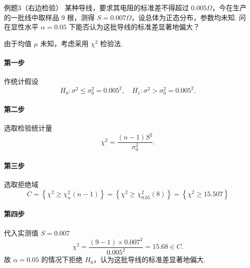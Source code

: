 \begin{question}{例题3（右边检验）}
    某种导线，要求其电阻的标准差不得超过 $0.005\Omega$，今在生产的一批线中取样品 9 根，测得 $S=0.007\Omega$，设总体为正态分布，参数均未知. 问在显性水平 $\alpha=0.05$ 下能否认为这批导线的标准差显著地偏大？
\end{question}
\begin{solution}
    由于均值 $\mu$ 未知，考虑采用 $\chi^2$ 检验法.
    \paragraph{第一步} 作统计假设
    $$
        H_0: \sigma^2 \leqslant \sigma_0^2 = 0.005^2, \quad H_1: \sigma^2 > \sigma_0^2 = 0.005^2.
    $$
    \paragraph{第二步} 选取检验统计量
    $$
        \chi^2 = \frac{(n-1)S^2}{\sigma_0^2}.
    $$
    \paragraph{第三步} 选取拒绝域
    $$
        C = \left\{\chi^2 \geqslant \chi_{\alpha}^2(n-1)\right\}
        = \left\{\chi^2 \geqslant \chi_{0.05}^2(8)\right\}
        = \left\{\chi^2 \geqslant 15.507\right\}
    $$
    \paragraph{第四步} 代入实测值 $S=0.007$
    $$
        \chi^2 = \frac{(9-1) \times 0.007^2}{0.005^2} = 15.68 \in C.
    $$
    故 $\alpha = 0.05$ 的情况下拒绝 $H_0$，认为这批导线的标准差显著地偏大.
\end{solution}